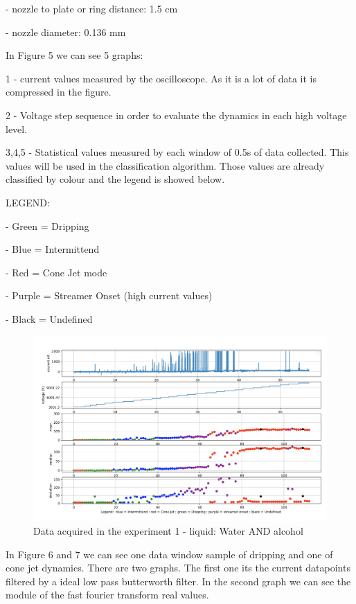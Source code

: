     - nozzle to plate or ring distance: 1.5 cm

    - nozzle diameter: 0.136 mm

    In Figure 5 we can see 5 graphs: 

    1 - current values measured by the oscilloscope. As it is a lot of data it is compressed in the figure.

    2 - Voltage step sequence in order to evaluate the dynamics in each high voltage level.

    3,4,5 - Statistical values measured by each window of 0.5s of data collected. This values will be used in the classification algorithm.
    Those values are already classified by colour and the legend is showed below.

    LEGEND:

    - Green = Dripping

    - Blue =  Intermittend

    - Red = Cone Jet mode

    - Purple = Streamer Onset (high current values)

    - Black = Undefined

    \begin{figure}[H]
        \center
        \includegraphics[width=17cm]{images/images_folder_2/img1.png}
        \caption{Data acquired in the experiment 1 - liquid: Water AND alcohol}
    \end{figure}

    In Figure 6 and 7 we can see one data window sample of dripping and one of cone jet dynamics. There are two graphs. The first one its
    the current datapoints filtered by a ideal low pass butterworth filter. In the second graph we can see the module of the fast fourier transform real values.

